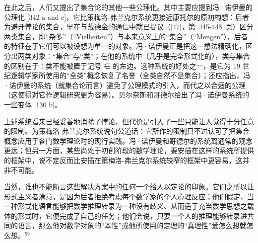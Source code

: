 在此之后，人们又提出了集合论的其他一些公理化。其中主要应提到冯·诺伊曼的公理化 {[}342 a and c{]}，它比策梅洛-弗兰克尔系统更接近康托尔的原初构想：后者为避开悖论的集合，早在与戴德金的通信中就已提议（{[}47{]}，第~445-448~页）区分两类集合，即“杂多”（“Vielheiten”）与本来意义上的“集合”（“Mengen”），后者的特征在于它们可以被设想为单一的对象。冯·诺伊曼正是把这一想法精确化，区分出两类对象：“集合”与“类”；在他的系统中（几乎是完全形式化的），类与集合的区别在于：类不能被置于记号 ∈ 的左边。这种系统的好处之一，是它为 19 世纪逻辑学家所使用的“全类”概念恢复了名誉（全类自然不是集合）；还应指出，冯·诺伊曼的系统（就集合论而言）避免了公理模式的引入，而代之以合适的公理（这使得对它作逻辑研究更为容易）。贝尔奈斯和哥德尔给出了冯·诺伊曼系统的一些变体 {[}130 b{]}。

上述系统看来已经妥善地消除了悖论，但代价是引入了一些只能让人觉得十分任意的限制。为策梅洛-弗兰克尔系统说句公道话：它所作的限制只不过认可了把集合概念应用于各门数学理论时的现行实践。冯·诺伊曼和哥德尔的系统离通常的观念更远；但另一方面，某些尚处于初创阶段的数学理论，要安插在这样的系统所提供的框架中，说不定反而比安插在策梅洛-弗兰克尔系统较窄的框架中更容易，这并非不可能。

当然，谁也不能断言这些解决方案中的任何一个给人以定论的印象。它们之所以让形式主义者满意，是因为后者拒绝考虑每个数学家的个人心理反应；他们假定，当一种形式化语言能够把数学推理转录为一种没有歧义、从而适于充当数学思想之载体的形式时，它便完成了自己的任务；他们会说，只要一个人的推理能够转录进共同的语言，那么他对数学对象的“本性”或他所使用的定理的“真理性”爱怎么想就怎么想。\(^{59}\)

